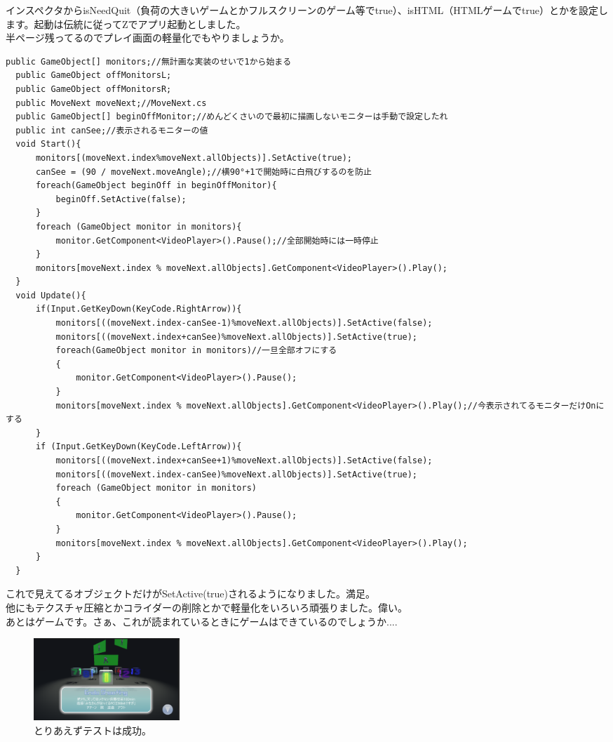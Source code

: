 \documentclass[b5paper,9pt,platex,dvipdfmx]{jsarticle}
\begin{document}
\begin{multicols*}{3}
インスペクタからisNeedQuit（負荷の大きいゲームとかフルスクリーンのゲーム等でtrue）、isHTML（HTMLゲームでtrue）とかを設定します。起動は伝統に従ってZでアプリ起動としました。\\
半ページ残ってるのでプレイ画面の軽量化でもやりましょうか。\\
\begin{lstlisting}[caption=Monitor.cs]
  public GameObject[] monitors;//無計画な実装のせいで1から始まる
  public GameObject offMonitorsL;
  public GameObject offMonitorsR;
  public MoveNext moveNext;//MoveNext.cs
  public GameObject[] beginOffMonitor;//めんどくさいので最初に描画しないモニターは手動で設定したれ
  public int canSee;//表示されるモニターの値
  void Start(){
      monitors[(moveNext.index%moveNext.allObjects)].SetActive(true);
      canSee = (90 / moveNext.moveAngle);//横90°+1で開始時に白飛びするのを防止
      foreach(GameObject beginOff in beginOffMonitor){
          beginOff.SetActive(false);
      }
      foreach (GameObject monitor in monitors){
          monitor.GetComponent<VideoPlayer>().Pause();//全部開始時には一時停止
      }
      monitors[moveNext.index % moveNext.allObjects].GetComponent<VideoPlayer>().Play();
  }
  void Update(){
      if(Input.GetKeyDown(KeyCode.RightArrow)){
          monitors[((moveNext.index-canSee-1)%moveNext.allObjects)].SetActive(false);
          monitors[((moveNext.index+canSee)%moveNext.allObjects)].SetActive(true);
          foreach(GameObject monitor in monitors)//一旦全部オフにする
          {
              monitor.GetComponent<VideoPlayer>().Pause();
          }
          monitors[moveNext.index % moveNext.allObjects].GetComponent<VideoPlayer>().Play();//今表示されてるモニターだけOnにする
      }
      if (Input.GetKeyDown(KeyCode.LeftArrow)){
          monitors[((moveNext.index+canSee+1)%moveNext.allObjects)].SetActive(false);
          monitors[((moveNext.index-canSee)%moveNext.allObjects)].SetActive(true);
          foreach (GameObject monitor in monitors)
          {
              monitor.GetComponent<VideoPlayer>().Pause();
          }
          monitors[moveNext.index % moveNext.allObjects].GetComponent<VideoPlayer>().Play();
      }
  }
\end{lstlisting}
これで見えてるオブジェクトだけがSetActive(true)されるようになりました。満足。\\
他にもテクスチャ圧縮とかコライダーの削除とかで軽量化をいろいろ頑張りました。偉い。\\
あとはゲームです。さぁ、これが読まれているときにゲームはできているのでしょうか....\\
\begin{figure}[H]
  \centering
  \includegraphics[width=5.5cm]{7.png}
  \caption{とりあえずテストは成功。}
\end{figure}
\end{multicols*}
\end{document}
